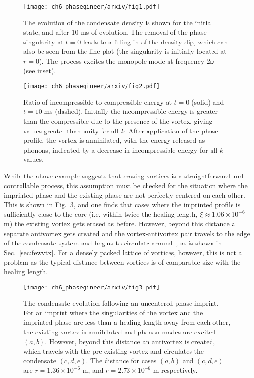 \begin{figure}\centering
    \texttt{[image: ch6\_phasegineer/arxiv/fig1.pdf]}
    \caption{The evolution of the condensate density is shown for the initial state, and after 10 ms of evolution. The removal of the phase singularity at $t=0$ leads to a filling in of the density dip, which can also be seen from the line-plot (the singularity is initially located at $r=0$). The process excites the monopole mode at frequency $2\omega_\perp$ (see inset).}\label{fig:annihilation_1vtx}
\end{figure}
\begin{figure}\centering
    \texttt{[image: ch6\_phasegineer/arxiv/fig2.pdf]}
    \caption{Ratio of incompressible to compressible energy at  $t=0$ (solid) and $t=10$ ms (dashed). Initially the incompressible energy is greater than the compressible due to the presence of the vortex, giving values greater than unity for all $k$. After application of the phase profile, the vortex is annihilated, with the energy released as phonons, indicated by a decrease in incompressible energy for all $k$ values.}\label{fig:kinspec}
\end{figure}

While the above example suggests that erasing vortices is a straightforward and controllable process, this assumption must be checked for the situation where the imprinted phase and the existing phase are not perfectly centered on each other. This is shown in Fig.~\ref{fig:annihilation_1vtx_uncentred}, and one finds that cases where the imprinted profile is sufficiently close to the core (i.e. within twice the healing length, $\xi\approx1.06\times 10^{-6}$ m) the existing vortex gets erased as before. However, beyond this distance a separate antivortex gets created and the vortex-antivortex pair travels to the edge of the condensate system and begins to circulate around~\cite{VTX:Martikainen_pra_2001}, as is shown in Sec.~\ref{sec:fewvtx}. For a densely packed lattice of vortices, however, this is not a problem as the typical distance between vortices is of comparable size with the healing length.

\begin{figure}\centering
    \texttt{[image: ch6\_phasegineer/arxiv/fig3.pdf]}
    \caption{The condensate evolution following an uncentered phase imprint. For an imprint where the singularities of the vortex and the imprinted phase are less than a healing length away from each other, the existing vortex is annihilated and phonon modes are excited $(a,b)$. However, beyond this distance an antivortex is created, which travels with the pre-existing vortex and circulates the condensate $(c,d,e)$. The distance for cases $(a,b)$ and $(c,d,e)$ are $r = 1.36\times10^{-6}$ m, and $r =2.73 \times10^{-6}$ m respectively.}\label{fig:annihilation_1vtx_uncentred}
\end{figure}


